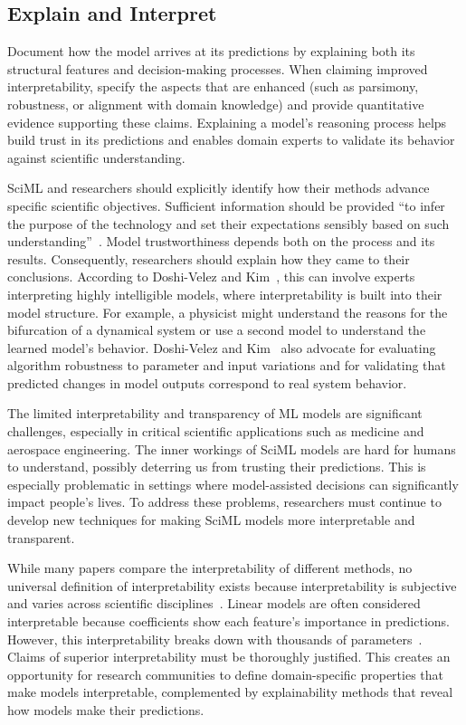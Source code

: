 \subsection{Explain and Interpret}

\begin{essrec}
Document how the model arrives at its predictions by explaining both its structural features and decision-making processes. When claiming improved interpretability, specify the aspects that are enhanced (such as parsimony, robustness, or alignment with domain knowledge) and provide quantitative evidence supporting these claims. Explaining a model's reasoning process helps build trust in its predictions and enables domain experts to validate its behavior against scientific understanding.
\end{essrec}

SciML and \CSE{} researchers should explicitly identify how their methods advance specific scientific objectives. Sufficient information should be provided ``to infer the purpose of the technology and set their expectations sensibly based on such understanding''~\cite{Toreini_ACEZM_ACM_2020}.
Model trustworthiness depends both on the process and its results.
Consequently, researchers should explain how they came to their conclusions.
According to Doshi-Velez and Kim~\cite{Doshi_K_arxiv_2017}, this can involve experts interpreting highly intelligible models, where interpretability is built into their model structure. 
For example, a physicist might understand the reasons for the bifurcation of a dynamical system or use a second model to understand the learned model's behavior. 
Doshi-Velez and Kim~\cite{Doshi_K_arxiv_2017} also advocate for evaluating algorithm robustness to parameter and input variations and for validating that predicted changes in model outputs correspond to real system behavior.

The limited interpretability and transparency of ML models are significant challenges, especially in critical scientific applications such as medicine and aerospace engineering.
The inner workings of SciML models are hard for humans to understand, possibly deterring us from trusting their predictions. This is especially problematic in settings where model-assisted decisions can significantly impact people's lives.
To address these problems, researchers must continue to develop new techniques for making SciML models more interpretable and transparent.

While many papers compare the interpretability of different methods, no universal definition of interpretability exists because interpretability is subjective and varies across scientific disciplines~\cite{Lipton_arxiv_2017}. 
Linear models are often considered interpretable because coefficients show each feature's importance in predictions. 
However, this interpretability breaks down with thousands of parameters~\cite{Molnar_CB_chapter_2020}.
Claims of superior interpretability must be thoroughly justified. This creates an opportunity for research communities to define domain-specific properties that make models interpretable, complemented by explainability methods that reveal how models make their predictions.


